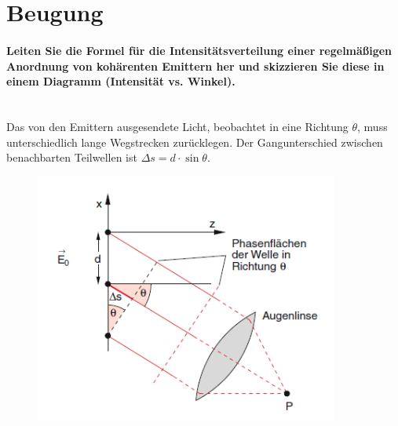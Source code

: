 \documentclass[a4paper, 11pt, ngerman, parskip=half-]{scrartcl}
\newcommand{\myparagraph}[1]{\paragraph{#1}\mbox{}\\}
\begin{document}
\section{Beugung}
\label{Beugung}

\myparagraph{Leiten Sie die Formel für die Intensitätsverteilung einer regelmäßigen Anordnung von
    kohärenten Emittern her und skizzieren Sie diese in einem Diagramm (Intensität vs.
    Winkel).}
Das von den Emittern ausgesendete Licht, beobachtet in eine Richtung $\theta$, muss unterschiedlich lange Wegstrecken zurücklegen. Der Gangunterschied zwischen benachbarten
Teilwellen ist $\Delta s = d \cdot \sin \theta$.

\begin{figure}[H]
    \centering
    \includegraphics[width=10cm]{image/19/1.1}
\end{figure}
\end{document}

